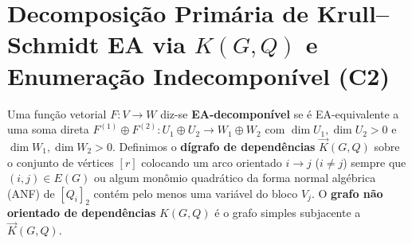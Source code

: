 \documentclass[11pt,a4paper]{article}
\theoremstyle{definition}
\theoremstyle{remark}
\begin{document}
\vspace{8pt}
\section{Decomposição Primária de Krull--Schmidt EA via $K(G,Q)$ e Enumeração Indecomponível (C2)}

Uma função vetorial $F : V \to W$ diz-se \textbf{EA-decomponível} se é EA-equivalente a uma soma direta $F^{(1)} \oplus F^{(2)} : U_1 \oplus U_2 \to W_1 \oplus W_2$ com $\dim U_1, \dim U_2 > 0$ e $\dim W_1, \dim W_2 > 0$. Definimos o \textbf{dígrafo de dependências} $\vec{K}(G,Q)$ sobre o conjunto de vértices $[r]$ colocando um arco orientado $i \to j$ ($i \neq j$) sempre que $(i,j) \in E(G)$ ou algum monômio quadrático da forma normal algébrica (ANF) de $[Q_i]_2$ contém pelo menos uma variável do bloco $V_j$. O \textbf{grafo não orientado de dependências} $K(G,Q)$ é o grafo simples subjacente a $\vec{K}(G,Q)$.
\end{document}
